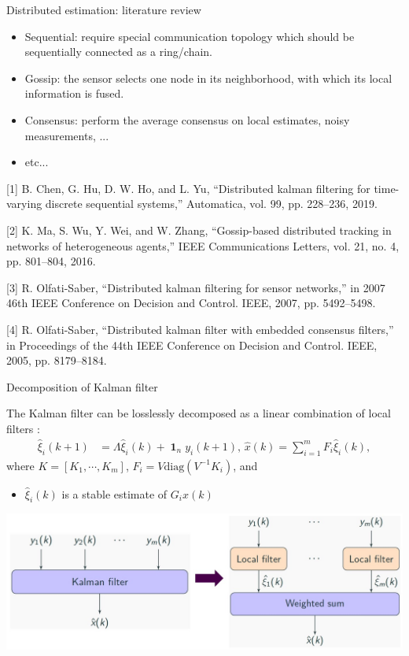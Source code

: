 \documentclass[10pt]{beamer}
\newcommand{\diag}{\text{diag}}
\DeclareMathOperator{\1}{\textbf{1}}
\begin{document}
\begin{frame}{Distributed estimation: literature review}
  \begin{itemize}
    \item Sequential: require special communication topology which should be sequentially connected as a ring/chain.
    \item Gossip: the sensor selects one node in its neighborhood, with which its local information is fused.
    \item Consensus: perform the average consensus on local estimates, noisy measurements, ... 
    \item etc...
  \end{itemize}
  {\scriptsize [1] B. Chen, G. Hu, D. W. Ho, and L. Yu, ``Distributed kalman filtering
    for time-varying discrete sequential systems,” Automatica, vol. 99, pp.
    228–236, 2019.

    [2] K. Ma, S. Wu, Y. Wei, and W. Zhang, ``Gossip-based distributed tracking
    in networks of heterogeneous agents,” IEEE Communications Letters,
    vol. 21, no. 4, pp. 801–804, 2016.

    [3] R. Olfati-Saber, ``Distributed kalman filtering for sensor networks,” in
    2007 46th IEEE Conference on Decision and Control. IEEE, 2007, pp.
    5492–5498.

    [4] R. Olfati-Saber, ``Distributed kalman filter with embedded consensus filters,” in
    Proceedings of the 44th IEEE Conference on Decision and Control.
    IEEE, 2005, pp. 8179–8184.

  }
\end{frame}

\begin{frame}{Decomposition of Kalman filter}
      \begin{theorem}

	The Kalman filter can be losslessly decomposed as a linear combination of local filters :
	\begin{align*}
	  \hat \xi_i(k+1)&=\Lambda\hat \xi_i(k)+\1_ny_i(k+1),\, \hat x(k)=\sum_{i=1}^m F_i\hat \xi_i(k),
	\end{align*}
	where $K=[K_1,\cdots,K_m]$, $F_i=V \diag(V^{-1}K_i)$, and 
	\begin{itemize}
	  \item $\hat\xi_i(k)$ is a stable estimate of $G_ix(k)$
	\end{itemize}	
      \end{theorem}
\centering
\includegraphics[width=1.0\textwidth]{pic/decomp}
\end{frame}
\end{document}
